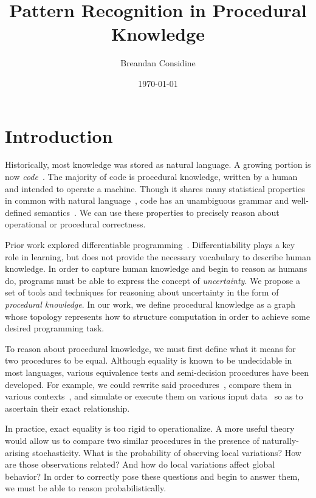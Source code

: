 \documentclass[11pt]{article}
\title{Pattern Recognition in Procedural Knowledge}
\author{Breandan Considine}
\date{\today}
\begin{document}
    \maketitle

    \tableofcontents
    \pagebreak


    \section{Introduction}

    Historically, most knowledge was stored as natural language. A growing portion is now \textit{code}~\citep{allamanis2018survey}. The majority of code is procedural knowledge, written by a human and intended to operate a machine. Though it shares many statistical properties in common with natural language~\citep{hindle2012naturalness}, code has an unambiguous grammar and well-defined semantics~\citep{pierce2010software}. We can use these properties to precisely reason about operational or procedural correctness.

    Prior work explored differentiable programming~\citep{considine2019programming}. Differentiability plays a key role in learning, but does not provide the necessary vocabulary to describe human knowledge. In order to capture human knowledge and begin to reason as humans do, programs must be able to express the concept of \textit{uncertainty}. We propose a set of tools and techniques for reasoning about uncertainty in the form of \textit{procedural knowledge}. In our work, we define procedural knowledge as a graph whose topology represents how to structure computation in order to achieve some desired programming task.

    To reason about procedural knowledge, we must first define what it means for two procedures to be equal. Although equality is known to be undecidable in most languages, various equivalence tests and semi-decision procedures have been developed. For example, we could rewrite said procedures~\citep{baader1999term}, compare them in various contexts~\citep{felleisen1990expressive}, and simulate or execute them on various input data~\citep{chen2020metamorphic} so as to ascertain their exact relationship.

    In practice, exact equality is too rigid to operationalize. A more useful theory would allow us to compare two similar procedures in the presence of naturally-arising stochasticity. What is the probability of observing local variations? How are those observations related? And how do local variations affect global behavior? In order to correctly pose these questions and begin to answer them, we must be able to reason probabilistically.
\end{document}
